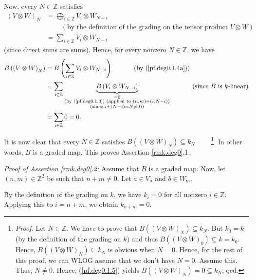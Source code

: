 \documentclass[etingof-lie.tex]{subfiles}
\begin{document}
\begin{verlong}
Now, every $N\in\mathbb{Z}$ satisfies%
\begin{align}
\left(  V\otimes W\right)  _{N}  &  =\bigoplus\limits_{i\in\mathbb{Z}}%
V_{i}\otimes W_{N-i}\nonumber\\
&  \ \ \ \ \ \ \ \ \ \ \left(  \text{by the definition of the grading on the
tensor product }V\otimes W\right) \nonumber\\
&  =\sum\limits_{i\in\mathbb{Z}}V_{i}\otimes W_{N-i} \label{pf.deg0.1.4a}%
\end{align}
(since direct sums are sums). Hence, for every nonzero $N\in\mathbb{Z}$, we
have%
\begin{align}
B\left(  \left(  V\otimes W\right)  _{N}\right)   &  =B\left(  \sum
\limits_{i\in\mathbb{Z}}V_{i}\otimes W_{N-i}\right)
\ \ \ \ \ \ \ \ \ \ \left(  \text{by (\ref{pf.deg0.1.4a})}\right) \nonumber\\
&  =\sum\limits_{i\in\mathbb{Z}}\underbrace{B\left(  V_{i}\otimes
W_{N-i}\right)  }_{\substack{=0\\\text{(by (\ref{pf.deg0.1.3}) (applied to
}\left(  n,m\right)  =\left(  i,N-i\right)  \text{)}\\\text{(since }i+\left(
N-i\right)  =N\neq0\text{))}}}\ \ \ \ \ \ \ \ \ \ \left(  \text{since }B\text{
is }k\text{-linear}\right) \nonumber\\
&  =\sum\limits_{i\in\mathbb{Z}}0=0. \label{pf.deg0.1.5}%
\end{align}


It is now clear that every $N\in\mathbb{Z}$ satisfies $B\left(  \left(
V\otimes W\right)  _{N}\right)  \subseteq k_{N}$%
\ \ \ \ \footnote{\textit{Proof.} Let $N\in\mathbb{Z}$. We have to prove that
$B\left(  \left(  V\otimes W\right)  _{N}\right)  \subseteq k_{N}$. But
$k_{0}=k$ (by the definition of the grading on $k$) and thus $B\left(  \left(
V\otimes W\right)  _{0}\right)  \subseteq k=k_{0}$. Hence, $B\left(  \left(
V\otimes W\right)  _{N}\right)  \subseteq k_{N}$ is obvious when $N=0$. Hence,
for the rest of this proof, we can WLOG assume that we don't have $N=0$.
Assume this. Thus, $N\neq0$. Hence, (\ref{pf.deg0.1.5}) yields $B\left(
\left(  V\otimes W\right)  _{N}\right)  =0\subseteq k_{N}$, qed.}. In other
words, $B$ is a graded map. This proves Assertion \ref{rmk.deg0}.1.

\textit{Proof of Assertion \ref{rmk.deg0}.2:} Assume that $B$ is a graded map.
Now, let $\left(  n,m\right)  \in\mathbb{Z}^{2}$ be such that $n+m\neq0$. Let
$a\in V_{n}$ and $b\in W_{m}$.

By the definition of the grading on $k$, we have $k_{i}=0$ for all nonzero
$i\in\mathbb{Z}$. Applying this to $i=n+m$, we obtain $k_{n+m}=0$.


\end{verlong}
\end{document}
